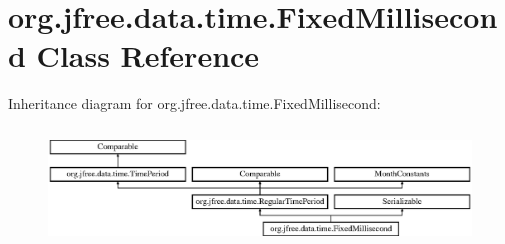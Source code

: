 \hypertarget{classorg_1_1jfree_1_1data_1_1time_1_1_fixed_millisecond}{}\section{org.\+jfree.\+data.\+time.\+Fixed\+Millisecond Class Reference}
\label{classorg_1_1jfree_1_1data_1_1time_1_1_fixed_millisecond}
Inheritance diagram for org.\+jfree.\+data.\+time.\+Fixed\+Millisecond\+:\begin{figure}[H]
\begin{center}
\leavevmode
\includegraphics[height=3.190883cm]{classorg_1_1jfree_1_1data_1_1time_1_1_fixed_millisecond}
\end{center}
\end{figure}
